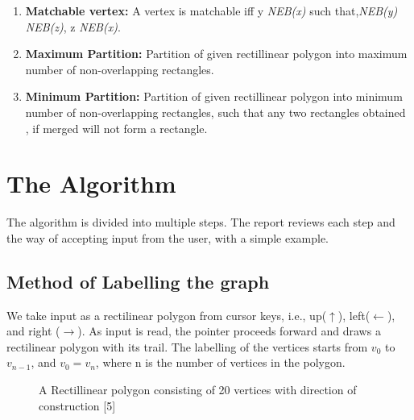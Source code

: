 \begin{enumerate}
\begin{figure}[h]
	\label{fig:convex bipartite}
\end{figure}
  \item \textbf{Matchable vertex:} A vertex is matchable iff \exists y \in{} \emph{NEB(x)} such that,\emph{NEB(y)} \subseteq \emph{NEB(z)}, \forall z \in \emph{NEB(x)}.
  \item \textbf{Maximum Partition:} Partition of given rectillinear polygon into maximum number of non-overlapping rectangles.
  \item \textbf{Minimum Partition:} Partition of given rectillinear polygon into minimum number of non-overlapping rectangles, such that any two rectangles obtained , if merged will not form a rectangle.
\end{enumerate}


\chapter{The Algorithm}
\label{The Algorithm}
The algorithm is divided into multiple steps. The report reviews each step and the way of accepting input from the user, with a simple example.
\section{Method of Labelling the graph}
We take input as a rectilinear polygon from cursor keys, i.e., up($\uparrow$), left($\leftarrow$), and right ($\rightarrow$). As input is read, the pointer proceeds forward and draws a rectilinear polygon with its trail. The labelling of the vertices starts from $v_0$ to $v_{n-1}$, and $v_0 = v_n$, where n is the number of vertices in the polygon.

\begin{figure}[h]
	\centering
	\caption{A Rectillinear polygon consisting of 20 vertices with direction of construction [5]}
	\label{fig:Rect poly example}
\end{figure}
\newpage
